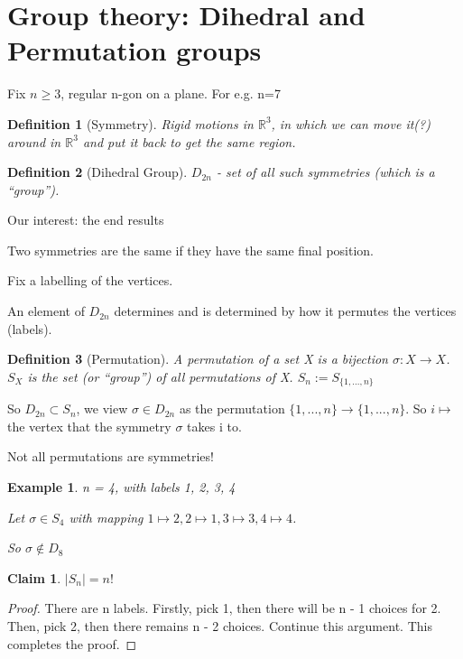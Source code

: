 \documentclass[11pt, oneside]{book}
\theoremstyle{break}
\newtheorem*{proof}{Proof}
\newtheorem{claim}{Claim}[section]
\newtheorem{defn}{Definition}[section]
\newtheorem{eg}{Example}[section]
\newcommand{\bb}[1]{\mathbb{#1}}			%
\begin{document}
\section{Group theory: Dihedral and Permutation groups}
Fix $n \geq 3$, regular n-gon on a plane. For e.g. n=7

\begin{defn}[Symmetry]
	Rigid motions in $\bb{R}^3$, in which we can move it(?) around in $\bb{R}^3$ and put it back to get the same region.
\end{defn}

\begin{defn}[Dihedral Group]
	$D_{2n}$ - set of all such symmetries (which is a ``group'').
\end{defn}

Our interest: the end results

Two symmetries are the same if they have the same final position.

Fix a labelling of the vertices.

An element of $D_{2n}$ determines and is determined by how it permutes the vertices (labels).

\begin{defn}[Permutation]
	A permutation of a set X is a bijection $\sigma: X \to X$. $S_X$ is the set (or ``group'') of all permutations of X.
	$S_n := S_{\{1, ..., n\}}$
\end{defn}

So $D_{2n} \subset S_n$, we view $\sigma \in D_{2n}$ as the permutation $\{1, ..., n\} \to \{1, ..., n\}$. So $i \mapsto$ the vertex that the symmetry $\sigma$ takes i to.

Not all permutations are symmetries!

\begin{eg}
	n = 4, with labels 1, 2, 3, 4

	Let $\sigma \in S_4$ with mapping $1 \mapsto 2, 2 \mapsto 1, 3 \mapsto 3, 4 \mapsto 4$.

	So $\sigma \notin D_8$
\end{eg}

\begin{claim}
	$|S_n| = n!$
\end{claim}

\begin{proof}
	There are n labels. Firstly, pick 1, then there will be n - 1 choices for 2. Then, pick 2, then there remains n - 2 choices. Continue this argument. This completes the proof.
\end{proof}
\end{document}
